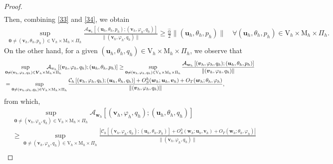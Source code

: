 \documentclass[10pt,a4paper]{article}
\begin{document}
\begin{proof}
\begin{align}
  			\end{align}
  			Then, combining \eqref{33} and \eqref{34}, we obtain
  			\begin{align}\label{35}
  			\sup _{\boldsymbol{0} \neq  (\boldsymbol{v}_h,\theta_h, p_h) \in \mathrm{V}_h \times \mathrm{M}_h \times  \Pi_h} \frac{\mathcal{A}_{\boldsymbol{w}_h}\left[(\boldsymbol{u}_h, \theta_h, p_h);(\boldsymbol{v}_h, \varphi_h, q_h)\right]}{\|(\boldsymbol{v}_h, \varphi_h, q_h)\|} \geq \frac{\hat{\alpha}}{2}\|(\boldsymbol{u}_h,\theta_h, p_h)\| \quad \forall(\boldsymbol{u}_h, \theta_h, p_h) \in  \mathrm{V}_h \times \mathrm{M}_h \times \Pi_h.
  			\end{align}
  			On the other hand, for a given $ (\boldsymbol{u}_h, \theta_h, q_h) \in \mathrm{V}_h \times \mathrm{M}_h \times  \Pi_h$, we observe that
  			$$
  			\begin{aligned}
  			& \sup_{\boldsymbol{0} \neq (\boldsymbol{v}_h, \varphi_h, q_h) \in \boldsymbol{V}_h \times \mathrm{M}_h \times \Pi_h\hspace{-1cm}}   \mathcal{A}_{\mathrm{w}_h}\left[(\boldsymbol{v}_h, \varphi_h, q_h);(\boldsymbol{u}_h, \theta_h,  p_h)\right]  \geq \sup_{\boldsymbol{0} \neq(\boldsymbol{v}_h, \varphi_h, q_h) \in \mathrm{V}_h \times \mathrm{M}_h \times  \Pi_h} \frac{\mathcal{A}_{\boldsymbol{w}_h}\left[(\boldsymbol{v}_h, \varphi_h, q_h);(\boldsymbol{u}_h, \theta_h, p_h)\right]}{\|(\boldsymbol{v}_h, \varphi_h, q_h)\|} \\
  			&  =\sup _{\boldsymbol{0} \neq(\boldsymbol{v}_h, \varphi_h, q_h) \in \mathrm{V}_h \times \mathrm{M}_h \times \Pi_h} \frac{\mathcal{C}_h\left[(\boldsymbol{v}_h, \varphi_h, q_h);(\boldsymbol{u}_h, \theta_h, q_h)\right]+{O}_S^h(\boldsymbol{w}_h ; \boldsymbol{u}_h, \boldsymbol{v}_h) + O_T(\boldsymbol{w}_h; \theta_h, \varphi_h)}{\|(\boldsymbol{v}_h, \varphi_h, q_h)\|},
  			\end{aligned}
  			$$
  			from which,
  			$$
  			\begin{aligned}
  			& \sup _{\boldsymbol{0} \neq (\boldsymbol{v}_h, \varphi_h, q_h) \in \mathrm{V}_h \times \mathrm{M}_h \times \Pi_h} \mathcal{A}_{\boldsymbol{w}_h}\left[( \boldsymbol{v}_h, \varphi_h, q_h);(\boldsymbol{u}_h, \theta_h, q_h)\right] \\ & \geq \sup _{\boldsymbol{0} \neq(\boldsymbol{v}_h, \varphi_h, q_h) \in \mathrm{V}_h \times \mathrm{M}_h \times \Pi_h}\frac{|\mathcal{C}_h\left[(\boldsymbol{v}_h, \varphi_h, q_h);( \boldsymbol{u}_h, \theta_h, p_h)\right]+{O}_S^h(\boldsymbol{w}_h ; \boldsymbol{u}_h, \boldsymbol{v}_h) + O_T(\boldsymbol{w}_h; \theta_h, \varphi_h)|}{\|( \boldsymbol{v}_h, \varphi_h, q_h)\|} \\

\end{aligned}$$
\end{proof}
\end{document}
